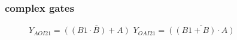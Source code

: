 \documentclass[aspectratio=169]{beamer}
\begin{document}

\begin{frame}
\frametitle{complex gates}
    \begin{figure}[h]
        \begin{center}
            \begin{circuitdiagram}{18}{8}
                \usgate
            \end{circuitdiagram}
            \hspace{2cm}
            \begin{circuitdiagram}{18}{8}
                \usgate
            \end{circuitdiagram}
        \end{center}
    $Y_{AOI21} = \overline{ ((B1 \cdot B ) + A) }$
    \hspace{2cm}
    $Y_{OAI21} = \overline{ ((B1 + B ) \cdot A) }$
    \end{figure}


\end{frame}
\end{document}
